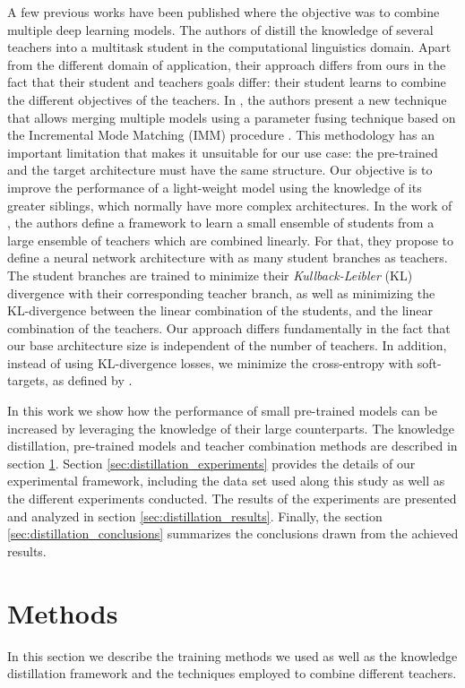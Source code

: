 A few previous works have been published where the objective was to combine multiple deep learning models. The authors of \autocite{liu2020b} distill the knowledge of several teachers into a multitask student in the computational linguistics domain. Apart from the different domain of application, their approach differs from ours in the fact that their student and teachers goals differ: their student learns to combine the different objectives of the teachers. In \autocite{geyer2019}, the authors present a new technique that allows merging multiple models using a parameter fusing technique based on the Incremental Mode Matching (IMM) procedure \autocite{lee2017}. This methodology has an important limitation that makes it unsuitable for our use case: the pre-trained and the target architecture must have the same structure. Our objective is to improve the performance of a light-weight model using the knowledge of its greater siblings, which normally have more complex architectures. In the work of \autocite{asif2019}, the authors define a framework to learn a small ensemble of students from a large ensemble of teachers which are combined linearly. For that, they propose to define a neural network architecture with as many student branches as teachers. The student branches are trained to minimize their \textit{Kullback-Leibler} (KL) divergence with their corresponding teacher branch, as well as minimizing the KL-divergence between the linear combination of the students, and the linear combination of the teachers. Our approach differs fundamentally in the fact that our base architecture size is independent of the number of teachers. In addition, instead of using KL-divergence losses, we minimize the cross-entropy with soft-targets, as defined by \autocite{hinton2015}.

In this work we show how the performance of small pre-trained models can be increased by leveraging the knowledge of their large counterparts. The knowledge distillation, pre-trained models and teacher combination methods are described in section  \ref{sec:distillation_methods}. Section \ref{sec:distillation_experiments} provides the details of our experimental framework, including the data set used along this study as well as the different experiments conducted. The results of the experiments are presented and analyzed in section \ref{sec:distillation_results}. Finally, the section \ref{sec:distillation_conclusions} summarizes the conclusions drawn from the achieved results.

\section{Methods} \label{sec:distillation_methods}
In this section we describe the training methods we used as well as the knowledge distillation framework and the techniques employed to combine different teachers.

